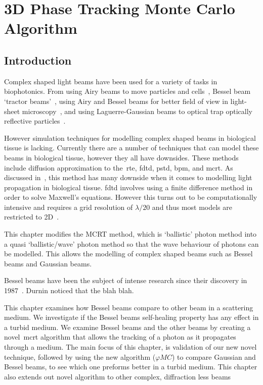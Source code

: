 \chapter{3D Phase Tracking Monte Carlo Algorithm}\label{sec:phase}

\section{Introduction}\label{sec:besintro}


Complex shaped light beams have been used for a variety of tasks in biophotonics.
From using Airy beams to move particles and cells~\cite{baumgartl2008optically}, Bessel beam `tractor beams'~\cite{ruffner2012optical}, using Airy and Bessel beams for better field of view in light-sheet microscopy~\cite{vettenburg2014light}, and using Laguerre-Gaussian beams to optical trap optically reflective particles~\cite{simpson1996optical}.


However simulation techniques for modelling complex shaped beams in biological tissue is lacking.
Currently there are a number of techniques that can model these beams in biological tissue, however they all have downsides.
These methods include diffusion approximation to the~\gls*{rte}, \gls*{fdtd}, \gls*{pstd}, \gls*{bpm}, and \gls*{mcrt}.
As discussed in~, this method has many downside when it comes to modelling light propagation in biological tissue.
\gls{fdtd} involves using a finite difference method in order to solve Maxwell's equations.
However this turns out to be computationally intensive and requires a grid resolution of $\lambda/20$ and thus most models are restricted to 2D~\cite{glaser2016fractal,elmaklizi2015penetration}. 


This chapter modifies the MCRT method, which is `ballistic' photon method into a quasi `ballistic/wave' photon method so that the wave behaviour of photons can be modelled.
This allows the modelling of complex shaped beams such as Bessel beams and Gaussian beams.

Bessel beams have been the subject of intense research since their discovery in 1987~\cite{durnin1987diffraction,durnin1987exact}. Durnin noticed that the blah blah.

This chapter examines how Bessel beams compare to other beam in a scattering medium. 
We investigate if the Bessel beams self-healing property has any effect in a turbid medium.{}
We examine Bessel beams and the other beams by creating a novel~\gls*{mcrt} algorithm that allows the tracking of a photon as it propagates through a medium. 
The main focus of this chapter, is validation of our new novel technique, followed by using the new algorithm ($\varphi MC$) to compare Gaussian and Bessel beams, to see which one preforms better in a turbid medium. 
This chapter also extends out novel algorithm to other complex, diffraction less beams


